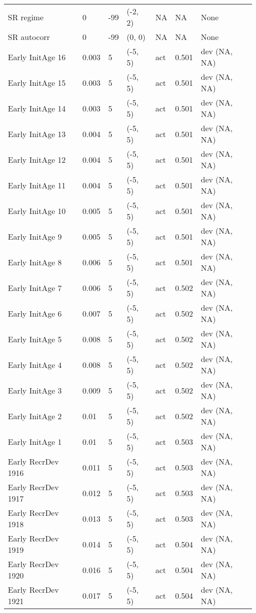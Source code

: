\documentclass[11pt,
  letterpaper,
]{article}
\begin{document}
\begin{landscape}
\begin{longtable}[t]{>{\raggedright\arraybackslash}p{7.5cm}lllll>{\raggedright\arraybackslash}p{3.5cm}}
SR regime & 0 & -99 & (-2, 2) & NA & NA & None\\
SR autocorr & 0 & -99 & (0, 0) & NA & NA & None\\
Early InitAge 16 & 0.003 & 5 & (-5, 5) & act & 0.501 & dev (NA, NA)\\
Early InitAge 15 & 0.003 & 5 & (-5, 5) & act & 0.501 & dev (NA, NA)\\
Early InitAge 14 & 0.003 & 5 & (-5, 5) & act & 0.501 & dev (NA, NA)\\
Early InitAge 13 & 0.004 & 5 & (-5, 5) & act & 0.501 & dev (NA, NA)\\
Early InitAge 12 & 0.004 & 5 & (-5, 5) & act & 0.501 & dev (NA, NA)\\
Early InitAge 11 & 0.004 & 5 & (-5, 5) & act & 0.501 & dev (NA, NA)\\
Early InitAge 10 & 0.005 & 5 & (-5, 5) & act & 0.501 & dev (NA, NA)\\
Early InitAge 9 & 0.005 & 5 & (-5, 5) & act & 0.501 & dev (NA, NA)\\
Early InitAge 8 & 0.006 & 5 & (-5, 5) & act & 0.501 & dev (NA, NA)\\
Early InitAge 7 & 0.006 & 5 & (-5, 5) & act & 0.502 & dev (NA, NA)\\
Early InitAge 6 & 0.007 & 5 & (-5, 5) & act & 0.502 & dev (NA, NA)\\
Early InitAge 5 & 0.008 & 5 & (-5, 5) & act & 0.502 & dev (NA, NA)\\
Early InitAge 4 & 0.008 & 5 & (-5, 5) & act & 0.502 & dev (NA, NA)\\
Early InitAge 3 & 0.009 & 5 & (-5, 5) & act & 0.502 & dev (NA, NA)\\
Early InitAge 2 & 0.01 & 5 & (-5, 5) & act & 0.502 & dev (NA, NA)\\
Early InitAge 1 & 0.01 & 5 & (-5, 5) & act & 0.503 & dev (NA, NA)\\
Early RecrDev 1916 & 0.011 & 5 & (-5, 5) & act & 0.503 & dev (NA, NA)\\
Early RecrDev 1917 & 0.012 & 5 & (-5, 5) & act & 0.503 & dev (NA, NA)\\
Early RecrDev 1918 & 0.013 & 5 & (-5, 5) & act & 0.503 & dev (NA, NA)\\
Early RecrDev 1919 & 0.014 & 5 & (-5, 5) & act & 0.504 & dev (NA, NA)\\
Early RecrDev 1920 & 0.016 & 5 & (-5, 5) & act & 0.504 & dev (NA, NA)\\
Early RecrDev 1921 & 0.017 & 5 & (-5, 5) & act & 0.504 & dev (NA, NA)\\

\end{longtable}
\end{landscape}
\end{document}
